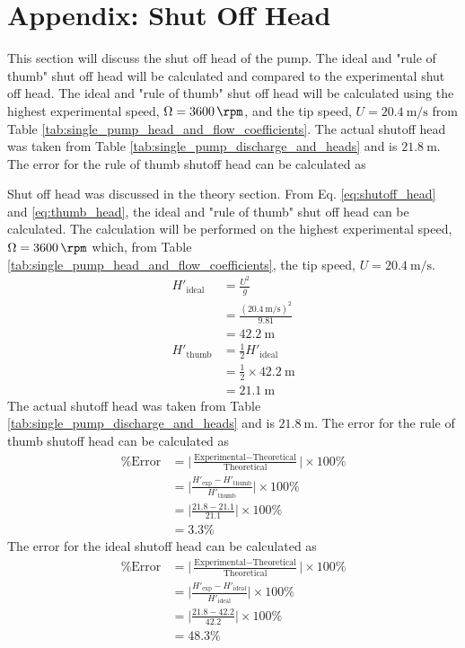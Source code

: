\section{Appendix: Shut Off Head}
\label{sec:shut_off_head}
This section will discuss the shut off head of the pump. The ideal and "rule of thumb" shut off head will be calculated and compared to the experimental shut off head. The ideal and "rule of thumb" shut off head will be calculated using the highest experimental speed, $\Omega = \qty{3600}{\rpm}$, and the tip speed, $U = \qty{20.4}{\meter\per\second}$ from Table \ref{tab:single_pump_head_and_flow_coefficients}. The actual shutoff head was taken from Table \ref{tab:single_pump_discharge_and_heads} and is $\qty{21.8}{\meter}$. The error for the rule of thumb shutoff head can be calculated as

Shut off head was discussed in the theory section. From Eq. \ref{eq:shutoff_head} and \ref{eq:thumb_head}, the ideal and "rule of thumb" shut off head can be calculated. The calculation will be performed on the highest experimental speed, $\Omega = \qty{3600}{\rpm}$ which, from Table \ref{tab:single_pump_head_and_flow_coefficients}, the tip speed, $U = \qty{20.4}{\meter\per\second}$. 
\begin{align*}
    H'_\text{ideal} &= \frac{U^2}{g} \\
    &= \frac{(\qty{20.4}{\meter\per\second})^2}{9.81} \\
    &= \qty{42.2}{\meter} \\
    H'_\text{thumb} &= \frac{1}{2} H'_\text{ideal} \\
    &= \frac{1}{2} \times \qty{42.2}{\meter} \\
    &= \qty{21.1}{\meter}
\end{align*}
The actual shutoff head was taken from Table \ref{tab:single_pump_discharge_and_heads} and is $\qty{21.8}{\meter}$. The error for the rule of thumb shutoff head can be calculated as
\begin{align*}
    \text{\% Error} &= \bigg|\frac{\text{Experimental} - \text{Theoretical}}{\text{Theoretical}}\bigg| \times 100\% \\
    &= \bigg|\frac{H'_\text{exp} - H'_\text{thumb}}{H'_\text{thumb}}\bigg| \times 100\% \\
    &= \bigg|\frac{21.8 - 21.1}{21.1}\bigg| \times 100\% \\
    &= 3.3\%
\end{align*}
The error for the ideal shutoff head can be calculated as
\begin{align*}
    \text{\% Error} &= \bigg|\frac{\text{Experimental} - \text{Theoretical}}{\text{Theoretical}}\bigg| \times 100\% \\
    &= \bigg|\frac{H'_\text{exp} - H'_\text{ideal}}{H'_\text{ideal}}\bigg| \times 100\% \\
    &= \bigg|\frac{21.8 - 42.2}{42.2}\bigg| \times 100\% \\
    &= 48.3\%
\end{align*}